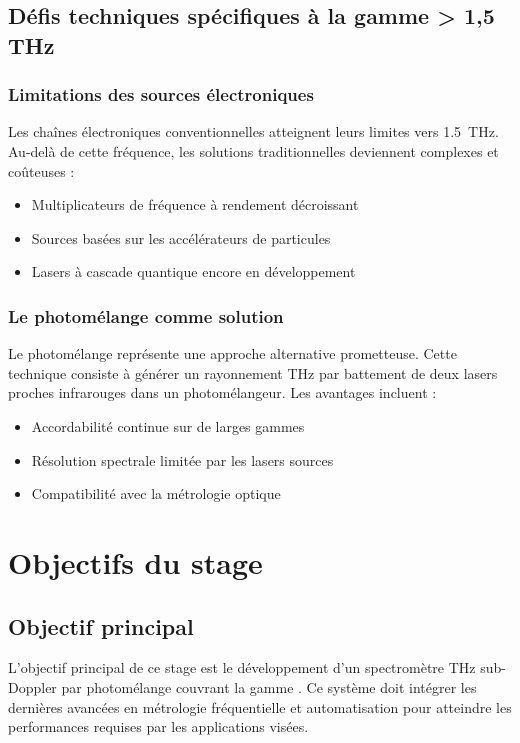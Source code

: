 \subsection{Défis techniques spécifiques à la gamme > 1,5 THz}

\subsubsection{Limitations des sources électroniques}

Les chaînes électroniques conventionnelles atteignent leurs limites vers \SI{1.5}{\THz}. Au-delà de cette fréquence, les solutions traditionnelles deviennent complexes et coûteuses :
\begin{itemize}
    \item Multiplicateurs de fréquence à rendement décroissant
    \item Sources basées sur les accélérateurs de particules
    \item Lasers à cascade quantique encore en développement
\end{itemize}

\subsubsection{Le photomélange comme solution}

Le photomélange représente une approche alternative prometteuse. Cette technique consiste à générer un rayonnement THz par battement de deux lasers proches infrarouges dans un photomélangeur. Les avantages incluent :
\begin{itemize}
    \item Accordabilité continue sur de larges gammes
    \item Résolution spectrale limitée par les lasers sources
    \item Compatibilité avec la métrologie optique
\end{itemize}

\section{Objectifs du stage}

\subsection{Objectif principal}

L'objectif principal de ce stage est le développement d'un spectromètre THz sub-Doppler par photomélange couvrant la gamme \thzrange. Ce système doit intégrer les dernières avancées en métrologie fréquentielle et automatisation pour atteindre les performances requises par les applications visées.

